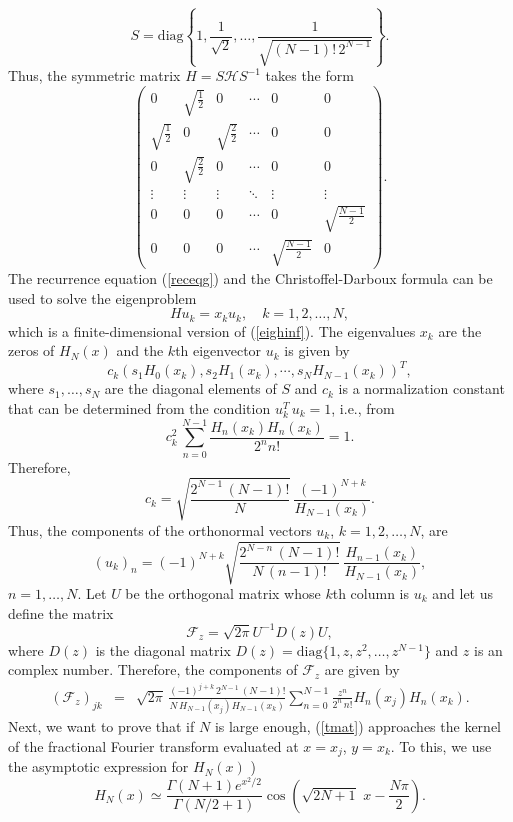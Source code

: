 \documentclass[12pt]{article}
\begin{document}
\[
S=\text{diag}\left\{1,\frac{1}{\sqrt{2}},\ldots,\frac{1}{\sqrt{(N-1)!\,2^{N-1}}}\right\}.
\]
Thus, the symmetric matrix $H=S{\mathcal H} S^{-1}$ takes the form
\[
\begin{pmatrix}0&\sqrt{\frac{1}{2}}&0&\cdots & 0& 0\\\sqrt{\frac{1}{2}}& 0& \sqrt{\frac{2}{2}}&\cdots & 0& 0\\
0& \sqrt{\frac{2}{2}}& 0&\cdots &  0& 0\\
\vdots&\vdots&\vdots&\ddots&\vdots&\vdots\\
0& 0& 0&\cdots & 0&\sqrt{\frac{N-1}{2}}\\0& 0& 0&\cdots & \sqrt{\frac{N-1}{2}}&0\end{pmatrix}.
\]
The recurrence equation (\ref{receqg}) and the Christoffel-Darboux formula \cite{Sze75} can be used to solve the eigenproblem 
\[
Hu_k=x_k u_k,\quad k=1,2,\ldots, N,
\]
which is a finite-dimensional version of (\ref{eighinf}). The eigenvalues $x_k$ are the zeros of $H_N(x)$ and the $k$th eigenvector $u_k$ is given by 
\[
c_k\left(s_1 H_0(x_k),s_2 H_1(x_k),\cdots,s_N H_{N-1}(x_k)\right)^T,
\]
where $s_1,\ldots,s_N$ are the diagonal elements of $S$ and $c_k$ is a normalization constant that can be determined from the condition $u_k^T\,u_k=1$, i.e., from
\[
c_k^2\,\sum_{n=0}^{N-1} \frac{H_n(x_k)H_n(x_k)}{2^n n!}=1.
\]
Therefore,
\[
c_k=\sqrt{\frac{2^{N-1}\,(N-1)!}{N}}\,\frac{(-1)^{N+k}}{ H_{N-1}(x_k)}.
\]
Thus, the components of the orthonormal vectors $u_k$, $k=1,2,\ldots, N$, are
\begin {equation}\label{ortvec}
(u_k)_n=(-1)^{N+k}\sqrt{\frac{2^{N-n}\,(N-1)!}{N\,(n-1)!}}\,\frac{H_{n-1}(x_k)}{H_{N-1}(x_k)},
\end{equation}
$n=1,\ldots,N$. Let $U$ be the orthogonal matrix whose $k$th column is $u_k$ and let us define the matrix  
\[
{\mathcal F}_z=\sqrt{2\pi}U^{-1}D(z)U,
\]
where $D(z)$ is the diagonal matrix $D(z)=\text{diag}\{1,z,z^2,\ldots,z^{N-1}\}$ and $z$ is an complex number. Therefore, the components of ${\mathcal F}_z$ are given by
\begin{eqnarray}\label{tmat}
({\mathcal F}_z)_{jk}&=&\sqrt{2\pi}\,\frac{(-1)^{j+k}\,2^{N-1}\,(N-1)!}{N\,H_{N-1}(x_j)H_{N-1}(x_k)}\sum_{n=0}^{N-1}\frac{z^n}{2^n\,n!}H_n(x_j)H_n(x_k).
\end{eqnarray}
Next, we want to prove that if $N$ is large enough, (\ref{tmat}) approaches the kernel of the fractional Fourier transform evaluated at $x=x_j$, $y=x_k$. To this, we use the asymptotic expression for $H_N(x)$ \cite{Sze75})
\begin{equation}\label{asymhnt}
H_N(x)\simeq\frac{\Gamma(N+1)e^{x^2/2}}{\Gamma(N/2+1)}\cos(\sqrt{2N+1}\,\,x-\frac{N\pi}{2}).
\end{equation}
\end{document}
